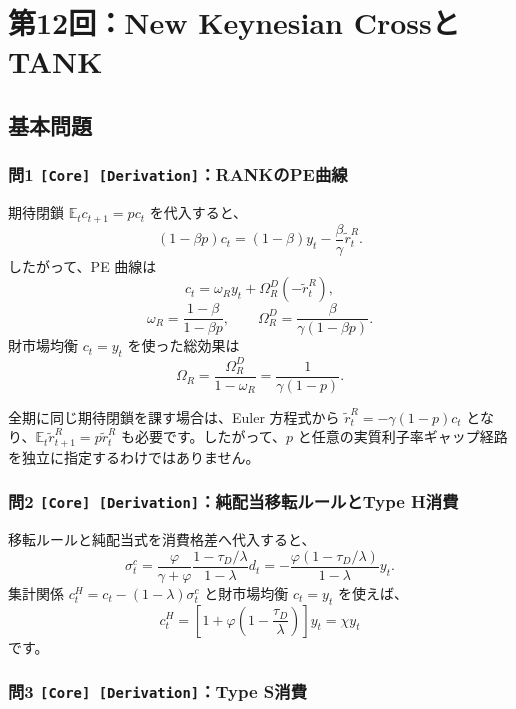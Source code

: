 \documentclass[
  japanese,
  lualatex,
  ja=standard,
  11pt,
  a4paper]{ltjsarticle}
\begin{document}
\clearpage

\section{第12回：New Keynesian
CrossとTANK}\label{ux7b2c12ux56denew-keynesian-crossux3068tank}

\subsection{基本問題}\label{ux57faux672cux554fux984c-11}

\subsubsection{\texorpdfstring{問1
\texttt{{[}Core{]}\ {[}Derivation{]}}：RANKのPE曲線}{問1 {[}Core{]} {[}Derivation{]}：RANKのPE曲線}}\label{ux554f1-core-derivationrankux306epeux66f2ux7dda}

期待閉鎖 \(\mathbb E_tc_{t+1}=pc_t\) を代入すると、 \[
(1-\beta p)c_t
=(1-\beta)y_t-\frac\beta\gamma\widetilde r_t^R.
\] したがって、PE 曲線は \[
c_t=\omega_Ry_t+\Omega_R^D(-\widetilde r_t^R),
\] \[
\omega_R=\frac{1-\beta}{1-\beta p},
\qquad
\Omega_R^D=\frac{\beta}{\gamma(1-\beta p)}.
\] 財市場均衡 \(c_t=y_t\) を使った総効果は \[
\Omega_R
=\frac{\Omega_R^D}{1-\omega_R}
=\frac{1}{\gamma(1-p)}.
\]

全期に同じ期待閉鎖を課す場合は、Euler 方程式から
\(\widetilde r_t^R=-\gamma(1-p)c_t\)
となり、\(\mathbb E_t\widetilde r_{t+1}^R=p\widetilde r_t^R\)
も必要です。したがって、\(p\)
と任意の実質利子率ギャップ経路を独立に指定するわけではありません。

\subsubsection{\texorpdfstring{問2
\texttt{{[}Core{]}\ {[}Derivation{]}}：純配当移転ルールとType
H消費}{問2 {[}Core{]} {[}Derivation{]}：純配当移転ルールとType H消費}}\label{ux554f2-core-derivationux7d14ux914dux5f53ux79fbux8ee2ux30ebux30fcux30ebux3068type-hux6d88ux8cbb}

移転ルールと純配当式を消費格差へ代入すると、 \[
\sigma_t^c
=\frac{\varphi}{\gamma+\varphi}
\frac{1-\tau_D/\lambda}{1-\lambda}d_t
=-\frac{\varphi(1-\tau_D/\lambda)}{1-\lambda}y_t.
\] 集計関係 \(c_t^H=c_t-(1-\lambda)\sigma_t^c\) と財市場均衡 \(c_t=y_t\)
を使えば、 \[
c_t^H
=\left[1+\varphi\left(1-\frac{\tau_D}{\lambda}\right)\right]y_t
=\chi y_t
\] です。

\subsubsection{\texorpdfstring{問3
\texttt{{[}Core{]}\ {[}Derivation{]}}：Type
S消費}{問3 {[}Core{]} {[}Derivation{]}：Type S消費}}\label{ux554f3-core-derivationtype-sux6d88ux8cbb}
\end{document}
